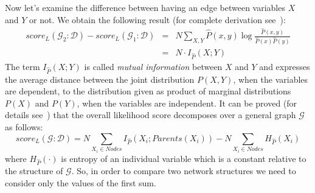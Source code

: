 \documentclass[english,cover]{fitthesis} %
\newcommand{\term}[1]{\emph{#1}}           %
\begin{document}
Now let's examine the difference between having an edge between variables $X$ and $Y$ or not. We obtain the following result (for complete derivation see~\cite[p.~791]{pgm}):
\begin{eqnarray*}
   score_L(\mathcal{G}_2 : \mathcal{D}) - score_L(\mathcal{G}_1 : \mathcal{D}) %
     & = & N \sum_{X,Y} \hat P(x,y) \log \frac{\hat P(x, y)}{\hat P(x) \hat P(y)} \\
     & = & N \cdot I_{\hat P}(X; Y)
\end{eqnarray*}
The term $I_{\hat P}(X; Y)$ is called \term{mutual information} between $X$ and $Y$ and expresses the average distance between the joint distribution $P(X,Y)$, when the variables are dependent, to the distribution given as product of marginal distributions $P(X)$ and $P(Y)$, when the variables are independent. It can be proved (for details see~\cite[p.~792]{pgm}) that the overall likelihood score decomposes over a general graph $\mathcal{G}$ as follows:
\begin{equation}
    score_L(\mathcal{G} : \mathcal{D}) = N \!\!\!\!\!\! \sum_{X_i \in Nodes} \!\!\!\!\!\! I_{\hat P}(X_i;Parents(X_i)) - N \!\!\!\!\!\! \sum_{X_i \in Nodes} \!\!\!\!\!\! H_{\hat P}(X_i)
\end{equation}
where $H_{\hat P}(\cdot)$ is entropy of an individual variable which is a constant relative to the structure of $\mathcal{G}$. So, in order to compare two network structures we need to consider only the values of the first sum.
\end{document}
